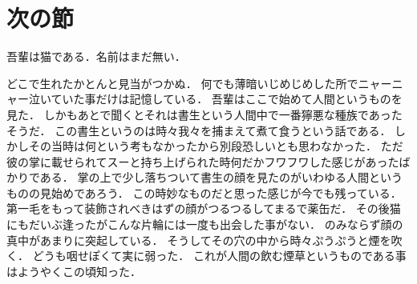 \documentclass[./main]{subfiles}
\begin{document}
\section{次の節}

吾輩は猫である．名前はまだ無い．

どこで生れたかとんと見当がつかぬ．
何でも薄暗いじめじめした所でニャーニャー泣いていた事だけは記憶している．
吾輩はここで始めて人間というものを見た．
しかもあとで聞くとそれは書生という人間中で一番獰悪な種族であったそうだ．
この書生というのは時々我々を捕まえて煮て食うという話である．
しかしその当時は何という考もなかったから別段恐しいとも思わなかった．
ただ彼の掌に載せられてスーと持ち上げられた時何だかフワフワした感じがあったばかりである．
掌の上で少し落ちついて書生の顔を見たのがいわゆる人間というものの見始めであろう．
この時妙なものだと思った感じが今でも残っている．
第一毛をもって装飾されべきはずの顔がつるつるしてまるで薬缶だ．
その後猫にもだいぶ逢ったがこんな片輪には一度も出会した事がない．
のみならず顔の真中があまりに突起している．
そうしてその穴の中から時々ぷうぷうと煙を吹く．
どうも咽せぽくて実に弱った．
これが人間の飲む煙草というものである事はようやくこの頃知った．
\end{document}
